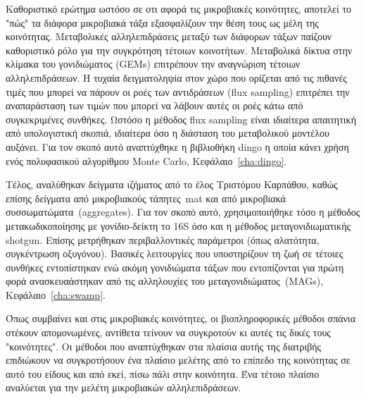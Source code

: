 \documentclass[master=elt, cleveref, autoref, masteroption=eg]{kulemt}
\begin{document}
\begin{abstract*}
   Καθοριστικό ερώτημα ωστόσο σε οτι αφορά τις μικροβιακές κοινότητες, αποτελεί το "πώς" τα διάφορα μικροβιακά τάξα 
   εξασφαλίζουν την θέση τους ως μέλη της κοινότητας. 
   Μεταβολικές αλληλεπιδράσεις μεταξύ των διάφορων τάξων παίζουν καθοριστικό ρόλο για την συγκρότηση 
   τέτοιων κοινοτήτων. 
   Μεταβολικά δίκτυα στην κλίμακα του γονιδιώματος (\foreignlanguage{english}{GEMs}) επιτρέπουν την 
   αναγνώριση τέτοιων αλληλεπιδράσεων. 
   Η τυχαία δειγματοληψία στον χώρο που ορίζεται από τις πιθανές τιμές που μπορεί να πάρουν οι ροές των αντιδράσεων (\foreignlanguage{english}{flux sampling})
   επιτρέπει την αναπαράσταση των τιμών που μπορεί να λάβουν αυτές οι ροές κάτω από συγκεκριμένες συνθήκες. 
   Ωστόσο η μέθοδος \foreignlanguage{english}{flux sampling} είναι ιδιαίτερα απαιτητική από υπολογιστική σκοπιά,
   ιδιαίτερα όσο η διάσταση του μεταβολικού μοντέλου αυξάνει.
   Για τον σκοπό αυτό αναπτύχθηκε η βιβλιοθήκη \foreignlanguage{english}{dingo} η οποία κάνει χρήση ενός 
   πολυφασικού αλγορίθμου \foreignlanguage{english}{Monte Carlo}, Κεφάλαιο~\foreignlanguage{english}{\ref{cha:dingo}}. 

   Τέλος, αναλύθηκαν δείγματα ιζήματος από το έλος Τριστόμου Καρπάθου, καθώς επίσης
   δείγματα από μικροβιακούς τάπητες~\foreignlanguage{english}{mat} και από μικροβιακά συσσωματώματα~(\foreignlanguage{english}{aggregates}).
   Για τον σκοπό αυτό, χρησιμοποιήθηκε τόσο η μέθοδος μετακωδικοποίησης με γονίδιο-δείκτη το 16\foreignlanguage{english}{S}
   όσο και η μέθοδος μεταγονιδιωματικής \foreignlanguage{english}{shotgun}.
   Επίσης μετρήθηκαν περιβαλλοντικές παράμετροι (όπως αλατότητα, συγκέντρωση οξυγόνου). 
   Βασικές λειτουργίες που υποστηρίζουν τη ζωή σε τέτοιες συνθήκες εντοπίστηκαν 
   ενώ ακόμη γονιδιώματα τάξων που εντοπίζονται για πρώτη φορά ανασκευαάστηκαν από τις αλληλουχίες του μεταγονιδιώματος~(\foreignlanguage{english}{MAGs}), Κεφάλαιο~\foreignlanguage{english}{\ref{cha:swamp}}.

   Όπως συμβαίνει και στις μικροβιακές κοινότητες, οι βιοπληροφορικές μέθοδοι σπάνια στέκουν 
   απομονωμένες, αντίθετα τείνουν να συγκροτούν κι αυτές τις δικές τους "κοινότητες". 
   Οι μέθοδοι που αναπτύχθηκαν στα πλαίσια αυτής της διατριβής επιδιώκουν να συγκροτήσουν ένα πλαίσιο μελέτης
   από το επίπεδο της κοινότητας σε αυτό του είδους και από εκεί, πίσω πάλι στην κοινότητα. 
   Ένα τέτοιο πλαίσιο αναλύεται για την μελέτη μικροβιακών αλληλεπιδράσεων. 



\end{abstract*}
\end{document}
